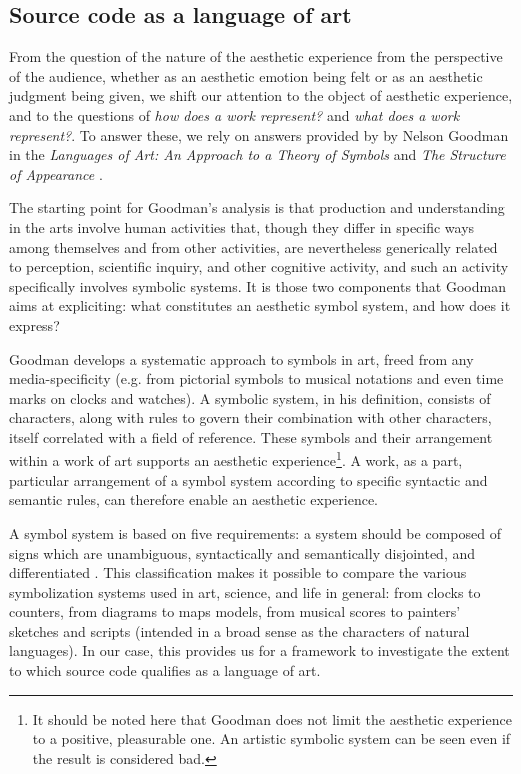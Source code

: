 \subsection{Source code as a language of art}
\label{subsec:source-code-language-art}

From the question of the nature of the aesthetic experience from the perspective of the audience, whether as an aesthetic emotion being felt or as an aesthetic judgment being given, we shift our attention to the object of aesthetic experience, and to the questions of \emph{how does a work represent?} and \emph{what does a work represent?}. To answer these, we rely on answers provided by by Nelson Goodman in the \emph{Languages of Art: An Approach to a Theory of Symbols} \citep{goodman_languages_1976} and \emph{The Structure of Appearance} \citep{goodman_structure_1966}.

The starting point for Goodman's analysis is that production and understanding in the arts involve human activities that, though they differ in specific ways among themselves and from other activities, are nevertheless generically related to perception, scientific inquiry, and other cognitive activity, and such an activity specifically involves symbolic systems. It is those two components that Goodman aims at expliciting: what constitutes an aesthetic symbol system, and how does it express?

Goodman develops a systematic approach to symbols in art, freed from any media-specificity (e.g. from pictorial symbols to musical notations and even time marks on clocks and watches). A symbolic system, in his definition, consists of characters, along with rules to govern their combination with other characters, itself correlated with a field of reference. These symbols and their arrangement within a work of art supports an aesthetic experience\footnote{It should be noted here that Goodman does not limit the aesthetic experience to a positive, pleasurable one. An artistic symbolic system can be seen even if the result is considered bad.}. A work, as a part, particular arrangement of a symbol system according to specific syntactic and semantic rules, can therefore enable an aesthetic experience.

A symbol system is based on five requirements: a system should be composed of signs which are unambiguous, syntactically and semantically disjointed, and differentiated \citep{goodman_languages_1976}. This classification makes it possible to compare the various symbolization systems used in art, science, and life in general: from clocks to counters, from diagrams to maps models, from musical scores to painters' sketches and scripts (intended in a broad sense as the characters of natural languages). In our case, this provides us for a framework to investigate the extent to which source code qualifies as a language of art.

